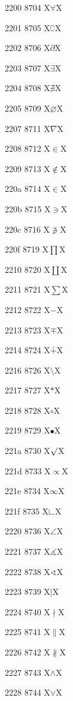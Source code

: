 \documentclass[11pt]{article}
\begin{document}
2200 8704 X{\ensuremath{\forall}}X

2201 8705 X{\ensuremath{\complement}}X

2202 8706 X{\ensuremath{\partial}}X

2203 8707 X{\ensuremath{\exists}}X

2204 8708 X{\ensuremath{\nexists}}X

2205 8709 X{\ensuremath{\varnothing}}X

2207 8711 X{\ensuremath{\nabla}}X

2208 8712 X{\ensuremath{\in}}X

2209 8713 X{\ensuremath{\notin}}X

220a 8714 X{\ensuremath{\in}}X

220b 8715 X{\ensuremath{\ni}}X

220c 8716 X{\ensuremath{\not\ni}}X

220f 8719 X{\ensuremath{\prod}}X

2210 8720 X{\ensuremath{\coprod}}X

2211 8721 X{\ensuremath{\sum}}X

2212 8722 X{\ensuremath{\minus}}X

2213 8723 X{\ensuremath{\mp}}X

2214 8724 X{\ensuremath{\dotplus}}X

2216 8726 X{\ensuremath{\setminus}}X

2217 8727 X{\ensuremath{\ast}}X

2218 8728 X{\ensuremath{\circ}}X

2219 8729 X{\ensuremath{\bullet}}X

221a 8730 X{\ensuremath{\surd}}X

221d 8733 X{\ensuremath{\propto}}X

221e 8734 X{\ensuremath{\infty}}X

221f 8735 X{\ensuremath{\rightangle}}X

2220 8736 X{\ensuremath{\angle}}X

2221 8737 X{\ensuremath{\measuredangle}}X

2222 8738 X{\ensuremath{\sphericalangle}}X

2223 8739 X{\ensuremath{\mid}}X

2224 8740 X{\ensuremath{\nmid}}X

2225 8741 X{\ensuremath{\parallel}}X

2226 8742 X{\ensuremath{\nparallel}}X

2227 8743 X{\ensuremath{\wedge}}X

2228 8744 X{\ensuremath{\vee}}X
\end{document}

